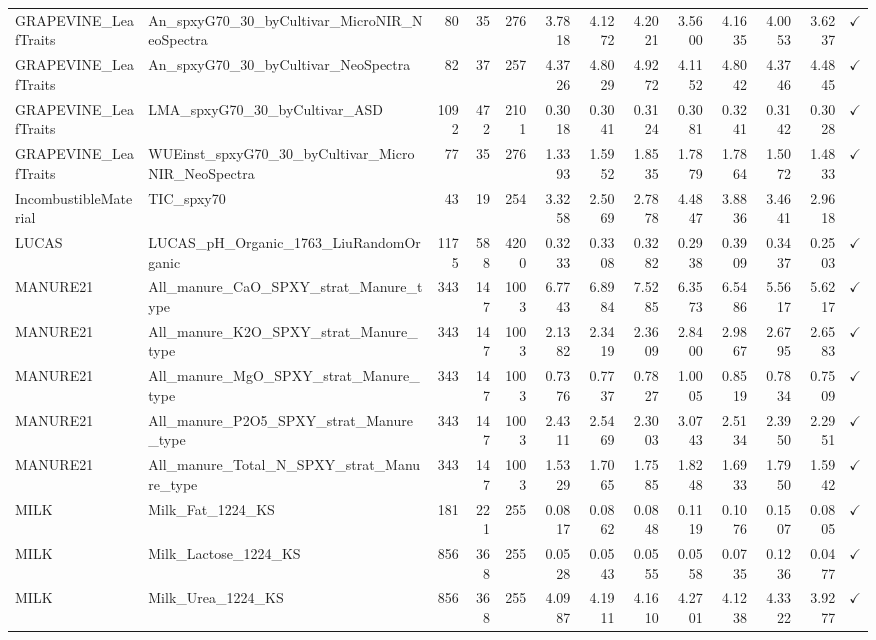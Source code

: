 \begin{tabular}{llrrrrrrrrrrc}
GRAPEVINE\_LeafTraits & An\_spxyG70\_30\_byCultivar\_MicroNIR\_NeoSpectra & 80 & 35 & 276 & 3.7818 & 4.1272 & 4.2021 & 3.5600 & 4.1635 & 4.0053 & 3.6237 & $\checkmark$ \\
GRAPEVINE\_LeafTraits & An\_spxyG70\_30\_byCultivar\_NeoSpectra & 82 & 37 & 257 & 4.3726 & 4.8029 & 4.9272 & 4.1152 & 4.8042 & 4.3746 & 4.4845 & $\checkmark$ \\
GRAPEVINE\_LeafTraits & LMA\_spxyG70\_30\_byCultivar\_ASD & 1092 & 472 & 2101 & 0.3018 & 0.3041 & 0.3124 & 0.3081 & 0.3241 & 0.3142 & 0.3028 & $\checkmark$ \\
GRAPEVINE\_LeafTraits & WUEinst\_spxyG70\_30\_byCultivar\_MicroNIR\_NeoSpectra & 77 & 35 & 276 & 1.3393 & 1.5952 & 1.8535 & 1.7879 & 1.7864 & 1.5072 & 1.4833 & $\checkmark$ \\
IncombustibleMaterial & TIC\_spxy70 & 43 & 19 & 254 & 3.3258 & 2.5069 & 2.7878 & 4.4847 & 3.8836 & 3.4641 & 2.9618 &  \\
LUCAS & LUCAS\_pH\_Organic\_1763\_LiuRandomOrganic & 1175 & 588 & 4200 & 0.3233 & 0.3308 & 0.3282 & 0.2938 & 0.3909 & 0.3437 & 0.2503 & $\checkmark$ \\
MANURE21 & All\_manure\_CaO\_SPXY\_strat\_Manure\_type & 343 & 147 & 1003 & 6.7743 & 6.8984 & 7.5285 & 6.3573 & 6.5486 & 5.5617 & 5.6217 & $\checkmark$ \\
MANURE21 & All\_manure\_K2O\_SPXY\_strat\_Manure\_type & 343 & 147 & 1003 & 2.1382 & 2.3419 & 2.3609 & 2.8400 & 2.9867 & 2.6795 & 2.6583 & $\checkmark$ \\
MANURE21 & All\_manure\_MgO\_SPXY\_strat\_Manure\_type & 343 & 147 & 1003 & 0.7376 & 0.7737 & 0.7827 & 1.0005 & 0.8519 & 0.7834 & 0.7509 & $\checkmark$ \\
MANURE21 & All\_manure\_P2O5\_SPXY\_strat\_Manure\_type & 343 & 147 & 1003 & 2.4311 & 2.5469 & 2.3003 & 3.0743 & 2.5134 & 2.3950 & 2.2951 & $\checkmark$ \\
MANURE21 & All\_manure\_Total\_N\_SPXY\_strat\_Manure\_type & 343 & 147 & 1003 & 1.5329 & 1.7065 & 1.7585 & 1.8248 & 1.6933 & 1.7950 & 1.5942 & $\checkmark$ \\
MILK & Milk\_Fat\_1224\_KS & 181 & 221 & 255 & 0.0817 & 0.0862 & 0.0848 & 0.1119 & 0.1076 & 0.1507 & 0.0805 & $\checkmark$ \\
MILK & Milk\_Lactose\_1224\_KS & 856 & 368 & 255 & 0.0528 & 0.0543 & 0.0555 & 0.0558 & 0.0735 & 0.1236 & 0.0477 & $\checkmark$ \\
MILK & Milk\_Urea\_1224\_KS & 856 & 368 & 255 & 4.0987 & 4.1911 & 4.1610 & 4.2701 & 4.1238 & 4.3322 & 3.9277 & $\checkmark$ \\

\end{tabular}

